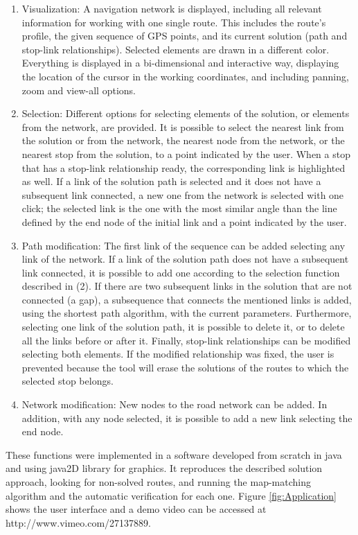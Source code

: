 \begin{enumerate}
\item Visualization: A navigation network is displayed, including all relevant information for working with one single route. This includes the route's profile, the given sequence of GPS points, and its current solution (path and stop-link relationships). Selected elements are drawn in a different color. Everything is displayed in a bi-dimensional and interactive way, displaying the location of the cursor in the working coordinates, and including panning, zoom and view-all options.
\item Selection: Different options for selecting elements of the solution, or elements from the network, are provided. It is possible to select the nearest link from the solution or from the network, the nearest node from the network, or the nearest stop from the solution, to a point indicated by the user. When a stop that has a stop-link relationship ready, the corresponding link is highlighted as well. If a link of the solution path is selected and it does not have a subsequent link connected, a new one from the network is selected with one click; the selected link is the one with the most similar angle than the line defined by the end node of the initial link and a point indicated by the user.
\item Path modification: The first link of the sequence can be added selecting any link of the network. If a link of the solution path does not have a subsequent link connected, it is possible to add one according to the selection function described in (2). If there are two subsequent links in the solution that are not connected (a gap), a subsequence that connects the mentioned links is added, using the shortest path algorithm, with the current parameters. Furthermore, selecting one link of the solution path, it is possible to delete it, or to delete all the links before or after it. Finally, stop-link relationships can be modified selecting both elements. If the modified relationship was fixed, the user  is prevented because the tool will erase the solutions of the routes to which the selected stop belongs.
\item Network modification: New nodes to the road network can be added. In addition, with any node selected, it is possible to add a new link selecting the end node.
\end{enumerate}

These functions were implemented in a software developed from scratch in java and using java2D library for graphics. It reproduces the described solution approach, looking for non-solved routes, and running the map-matching algorithm and the automatic verification for each one. Figure \ref{fig:Application} shows the user interface and a demo video can be accessed at http://www.vimeo.com/27137889.

